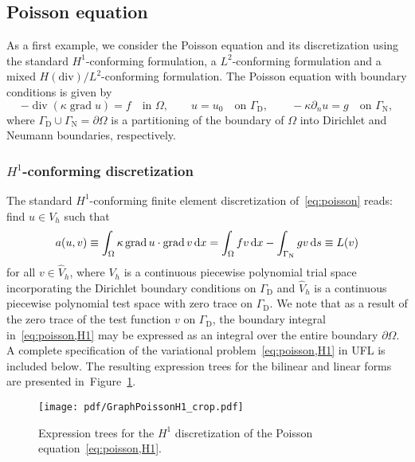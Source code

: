 \documentclass[prodmode,acmtoms]{acmsmall}
\DeclareMathOperator{\Div}{div}
\DeclareMathOperator{\Grad}{grad}
\newcommand{\dx}{\dif{}x}
\newcommand{\ds}{\dif{}s}
\newcommand{\GammaD}{\Gamma_{\mathrm{D}}}
\newcommand{\GammaN}{\Gamma_{\mathrm{N}}}
\begin{document}
\subsection{Poisson equation}

As a first example, we consider the Poisson equation and its
discretization using the standard $H^1$-conforming formulation, a
$L^2$-conforming formulation and a mixed $H(\mathrm{div})/L^2$-conforming
formulation. The Poisson equation with boundary conditions is given by
\begin{equation}
  \label{eq:poisson}
  - \Div (\kappa \Grad u) = f \quad  \text{in } \Omega,
  \qquad
  u = u_0 \quad \text{on } \GammaD,
  \qquad
  -\kappa \partial_n u = g \quad \text{on } \GammaN,
\end{equation}
where $\GammaD \cup \GammaN = \partial\Omega$ is a partitioning of the
boundary of $\Omega$ into Dirichlet and Neumann boundaries,
respectively.

\subsubsection{$H^1$-conforming discretization}

The standard $H^1$-conforming finite element discretization
of~\eqref{eq:poisson} reads: find $u \in V_h$ such that
\begin{equation}
  \label{eq:poisson,H1}
  a(u, v) \equiv \int_{\Omega} \kappa \Grad u \cdot \Grad v \dx
  =
  \int_{\Omega} f v \dx - \int_{\GammaN} gv \ds \equiv L(v)
\end{equation}
for all $v \in \hat{V}_h$, where $V_h$ is a continuous piecewise
polynomial trial space incorporating the Dirichlet boundary conditions
on $\GammaD$ and $\hat{V}_h$ is a continuous piecewise polynomial test
space with zero trace on $\GammaD$. We note that as a result of the
zero trace of the test function $v$ on $\GammaD$, the boundary
integral in~\eqref{eq:poisson,H1} may be expressed as an integral over
the entire boundary $\partial\Omega$. A complete specification of the
variational problem~\eqref{eq:poisson,H1} in UFL is included
below. The resulting expression trees for the bilinear and linear
forms are presented in~Figure~\ref{fig:GraphPoissonH1}.


\begin{figure}
\centering
  \texttt{[image: pdf/GraphPoissonH1\_crop.pdf]}
  \caption{Expression trees for the $H^1$ discretization of the
    Poisson equation~\eqref{eq:poisson,H1}.}
  \label{fig:GraphPoissonH1}
\end{figure}
\end{document}
